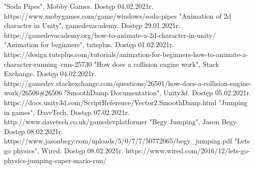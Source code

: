 \documentclass[oneside,polski,logo]{amuthesis}
\begin{document}
\begin{thebibliography}{7}
"Soda Pipes", Mobby Games. Dostęp 04.02.2021r.
https://www.mobygames.com/game/windows/soda-pipes
"Animation of 2d character in Unity", gamedevacademy. Dostęp 29.01.2021r.
https://gamedevacademy.org/how-to-animate-a-2d-character-in-unity/
"Animation for beginners", tutsplus. Dostęp 01.02.2021r.
https://design.tutsplus.com/tutorials/animation-for-beginners-how-to-animate-a-character-running--cms-25730
"How does a collision engine work", Stack Exchange. Dostęp 04.02.2021r.
https://gamedev.stackexchange.com/questions/26501/how-does-a-collision-engine-work/26506\#26506
"SmoothDamp Documentation", Unity3d. Dostęp 05.02.2021r.
https://docs.unity3d.com/ScriptReference/Vector2.SmoothDamp.html
"Jumping in games", DaveTech. Dostęp 07.02.2021r.
http://www.davetech.co.uk/gamedevplatformer
"Begy Jumping", Jason Begy. Dostęp 08.02.2021r.
https://www.jasonbegy.com/uploads/5/0/7/7/50772065/begy\_jumping.pdf
"Lets go physics", Wired. Dostęp 08.02.2021r.
https://www.wired.com/2016/12/lets-go-physics-jumping-super-mario-run/
\end{thebibliography}
\end{document}
